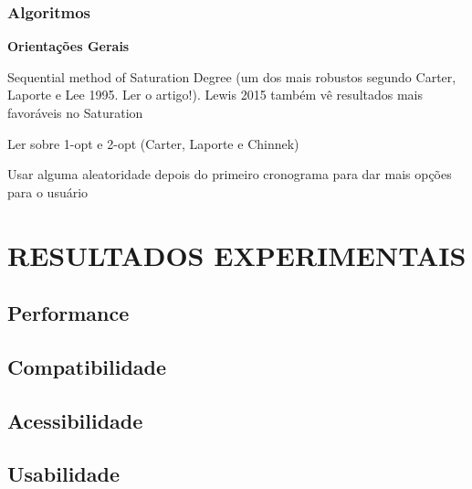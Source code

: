 \documentclass[12pt,a4paper]{article}
\begin{document}
				\lipsum[1]

			\subsubsection{Algoritmos}

				\textbf{Orientações Gerais}

				\par Sequential method of Saturation Degree (um dos mais robustos segundo Carter, Laporte e Lee 1995. Ler o artigo!).
				Lewis 2015 também vê resultados mais favoráveis no Saturation

				\par Ler sobre 1-opt e 2-opt (Carter, Laporte e Chinnek)

				\par Usar alguma aleatoridade depois do primeiro cronograma para dar mais opções para o usuário



	\section{RESULTADOS EXPERIMENTAIS}

		\lipsum[1]

		\subsection{Performance}

			\lipsum[1]

		\subsection{Compatibilidade}

			\lipsum[1]

		\subsection{Acessibilidade}

			\lipsum[1]

		\subsection{Usabilidade}

			\lipsum[1]


\end{document}
